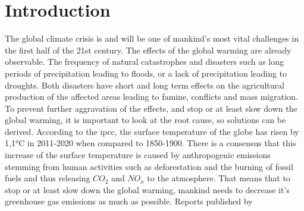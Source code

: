 \cleardoublepage
\chapter{Introduction}
\label{cha:introduction}
The global climate crisis is and will be one of mankind's most vital challenges in the first half of the 21st century.
The effects of the global warming are already observable.
The frequency of natural catastrophes and disasters such as long periods of precipitation leading to floods, or a lack of precipitation leading to droughts.
Both disasters have short and long term effects on the agricultural production of the affected areas leading to famine, conflicts and mass migration.
To prevent further aggravation of the effects, and stop or at least slow down the global warming, it is important to look at the root cause, so solutions can be derived. 
According to the \ac{ipcc}, the surface temperature of the globe has risen by 1,1°C in 2011-2020 when compared to 1850-1900\cite{lee2024climate}.
There is a consensus that this increase of the surface temperature is caused by anthropogenic emissions stemming from human activities such as deforestation and the burning of fossil fuels and thus releasing $CO_{2}$ and $NO_{x}$ to the atmosphere.
That means that to stop or at least slow down the global warming, mankind needs to decrease it's greenhouse gas emissions as much as possible.
Reports published by 

